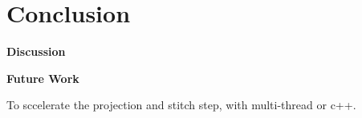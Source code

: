 \section{Conclusion}

\textbf{Discussion}


\textbf{Future Work}

To sccelerate the projection and stitch step, with multi-thread or c++.

